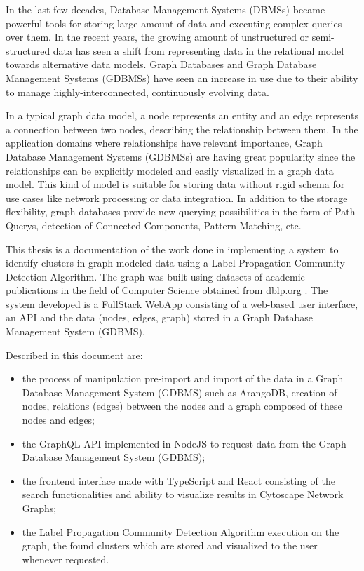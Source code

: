 In the last few decades, Database Management Systems (\acrshort{DBMS}s) became powerful tools for storing large amount of data and executing complex queries over them. In the recent years, the growing amount of unstructured or semi-structured data has seen a shift from representing data in the \gls{relational model} towards alternative data models. Graph Databases and Graph Database Management Systems (\acrshort{GDBMS}s) have seen an increase in use due to their ability to manage highly-interconnected, continuously evolving data.

In a typical graph data model, a node represents an entity and an edge represents a connection between two nodes, describing the relationship between them. In the application domains where relationships have relevant importance, Graph Database Management Systems (\acrshort{GDBMS}s) are having great popularity since the relationships can be explicitly modeled and easily visualized in a graph data model. This kind of model is suitable for storing data without rigid schema for use cases like network processing or data integration. In addition to the storage flexibility, graph databases provide new querying possibilities in the form of \glspl{Path Query}, detection of \gls{Connected Components}, \gls{Pattern Matching}, etc.

This thesis is a documentation of the work done in implementing a system to identify clusters in graph modeled data using a \gls{Label Propagation} Community Detection Algorithm.
The graph was built using datasets of academic publications in the field of Computer Science obtained from \gls{dblp.org} .
The system developed is a \gls{FullStack} \gls{WebApp} consisting of a web-based user interface, an \acrshort{API} and the data (nodes, edges, graph) stored in a Graph Database Management System (\acrshort{GDBMS}).

Described in this document are:
 \begin{itemize}[noitemsep]
	\item the process of manipulation pre-import and import of the data in a Graph Database Management System (\acrshort{GDBMS}) such as ArangoDB, creation of nodes, relations (edges) between the nodes and a graph composed of these nodes and edges;
	\item the GraphQL API implemented in NodeJS to request data from the Graph Database Management System (\acrshort{GDBMS});
	\item the frontend interface made with \gls{TypeScript} and \gls{React} consisting of the search functionalities and ability to visualize results in Cytoscape Network Graphs;
	\item the \gls{Label Propagation} Community Detection Algorithm execution on the graph, the found clusters which are stored and visualized to the user whenever requested.
\end{itemize}

